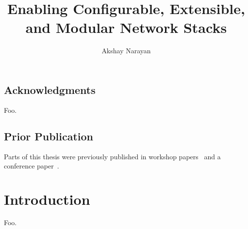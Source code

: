 \documentclass[fontsize=12pt,paper=letter,twosided,cleardoublepage=plain,final]{scrbook}
\title{Enabling Configurable, Extensible, and Modular Network Stacks}
\author{Akshay Narayan}
\begin{document}
\frontmatter



\cleardoublepage


\cleardoublepage

\section*{Acknowledgments}
\begin{spacing}{1}
%
    Foo.
\end{spacing}
\cleardoublepage

\section*{Prior Publication}
Parts of this thesis were previously published in workshop papers~\cite{ccp, bertha} and a conference
paper~\cite{ccp}.
\cleardoublepage

\tableofcontents

\mainmatter

\chapter{Introduction}\label{s:intro}

Foo.
\end{document}
